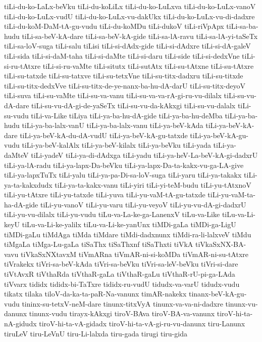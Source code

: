 {tiLi-du-ko-LaLx-beVku
tiLi-du-koLiLx
tiLi-du-ko-LuLxva
tiLi-du-ko-LuLx-vanoV
tiLi-du-ko-LuLx-vudU
tiLi-du-ko-LuLx-vu-dakUkx
tiLi-du-ko-LuLx-vu-di-dadxre
tiLi-du-koM-DaM-tA-gu-vudu
tiLi-du-koMDu
tiLi-dukoV
tiLi-riVpApx
tiLi-sa-ba-hudu
tiLi-sa-beV-kA-dare
tiLi-sa-beV-kA-gide
tiLi-sa-lA-ravu
tiLi-sa-lA-yi-taSeTx
tiLi-sa-loV-suga
tiLi-salu
tiLisi
tiLi-si-dAdx-gide
tiLi-si-dAdxre
tiLi-si-dA-galeV
tiLi-sida
tiLi-si-daM-taha
tiLi-si-daMte
tiLi-si-daru
tiLi-side
tiLi-si-dedxVne
tiLi-si-ru-tAtxre
tiLi-si-ru-vaMte
tiLi-situtx
tiLi-sutAtx
tiLi-su-tAtxne
tiLi-su-tAtxre
tiLi-su-tatxde
tiLi-su-tatxve
tiLi-su-tetxVne
tiLi-su-titx-dadxru
tiLi-su-titxde
tiLi-su-titx-dedxVve
tiLi-su-titx-de-ye-nanx-ba-hu-dA-darU
tiLi-su-titx-deyoV
tiLi-suva
tiLi-su-vaMte
tiLi-su-va-vanu
tiLi-su-va-va-rA-gi-ru-vu-dilalx
tiLi-su-vu-dA-dare
tiLi-su-vu-dA-gi-de-yaSeTx
tiLi-su-vu-da-kAkxgi
tiLi-su-vu-dalalx
tiLi-su-vudu
tiLi-va-Like
tiLiya
tiLi-ya-ba-hu-dA-gide
tiLi-ya-ba-hu-deMba
tiLi-ya-ba-hudu
tiLi-ya-ba-lalx-vanU
tiLi-ya-ba-lalx-vanu
tiLi-ya-beV-kAda
tiLi-ya-beV-kA-dare
tiLi-ya-beV-kA-du-dA-vudU
tiLi-ya-beV-kA-gu-tatxde
tiLi-ya-beV-kA-gu-vudu
tiLi-ya-beV-kalAlx
tiLi-ya-beV-kilalx
tiLi-ya-beVku
tiLi-yada
tiLi-ya-daMteV
tiLi-yadeV
tiLi-ya-di-dAdxga
tiLi-yadu
tiLi-ya-heV-La-beV-kA-gi-dadxrU
tiLi-ya-lA-radu
tiLi-ya-lapx-Da-beVku
tiLi-ya-lapx-Da-ta-kakx-vu-ga-LA-give
tiLi-ya-lapxTuTx
tiLi-yalu
tiLi-ya-pa-Di-sa-loV-suga
tiLi-yaru
tiLi-ya-takakx
tiLi-ya-ta-kakxdudx
tiLi-ya-ta-kakx-vanu
tiLi-yiri
tiLi-yi-teM-budu
tiLi-yu-tAtxnoV
tiLi-yu-tAtxre
tiLi-yu-tatxde
tiLi-yuva
tiLi-yu-vaM-tA-gu-tatxde
tiLi-yu-vaM-ta-ha-dA-gide
tiLi-yu-vanoV
tiLi-yu-varu
tiLi-yu-veyoV
tiLi-yu-vu-dA-gi-dadxrU
tiLi-yu-vu-dilalx
tiLi-yu-vudu
tiLu-va-La-ke-ga-LanenxV
tiLu-va-Like
tiLu-va-Li-keyU
tiLu-va-Li-ke-yalilx
tiLu-va-Li-ke-yanUnx
tiMDi-gaLa
tiMDi-ga-LigU
tiMDi-gaLu
tiMdAga
tiMda
tiMdare
tiMdi-dadxnunx
tiMdi-ra-li-lalxveV
tiMdu
tiMgaLa
tiMga-Lu-gaLa
tiSaThx
tiSaThxnf
tiSaThxti
tiVkA
tiVkaSxNX-BA-vavu
tiVkaSxNXtavxM
tiVmARna
tiVmAR-ni-si-koMDa
tiVmAR-ni-su-tAtxre
tiVrakekx
tiVri-sa-beV-kAda
tiVri-sa-beVku
tiVri-sa-leV-beVku
tiVri-si-dare
tiVtAvxR
tiVthaRda
tiVthaR-gaLa
tiVthaR-gaLu
tiVthaR-rU-pi-ga-LAda
tiVvarx
tididx
tididx-bi-TaTxre
tididx-ru-vudU
tidudx-va-varU
tidudx-vudu
tikatx
tilaka
tiloV-da-ka-ta-paR-Na-vanunx
timAR-nakekx
tinanx-beV-kA-gu-vudu
tininx-su-tetxV-neM-dare
tinunx-titxVyA
tinunx-va-va-ni-dadxre
tinunx-vu-danunx
tinunx-vudu
tirayx-kAkxgi
tiroV-BAva
tiroV-BA-va-vanunx
tiroV-hi-ta-nA-gidudx
tiroV-hi-ta-vA-gidadx
tiroV-hi-ta-vA-gi-ru-vu-danunx
tiru-Lanunx
tiruLeV
tiru-LeVnU
tiru-Li-lalxda
tiru-gada
tirugi
tiru-gida
}

